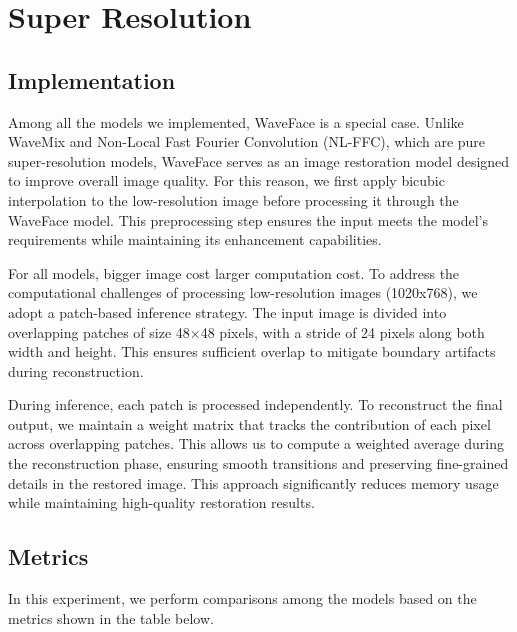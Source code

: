 \section{Super Resolution}
\subsection{Implementation}

Among all the models we implemented, WaveFace is a special case. Unlike WaveMix and Non-Local Fast Fourier Convolution (NL-FFC), which are pure super-resolution models, WaveFace serves as an image restoration model designed to improve overall image quality. For this reason, we first apply bicubic interpolation to the low-resolution image before processing it through the WaveFace model. This preprocessing step ensures the input meets the model's requirements while maintaining its enhancement capabilities.

For all models, bigger image cost larger computation cost. To address the computational challenges of processing low-resolution images (1020x768), we adopt a patch-based inference strategy. The input image is divided into overlapping patches of size 48×48 pixels, with a stride of 24 pixels along both width and height. This ensures sufficient overlap to mitigate boundary artifacts during reconstruction.

During inference, each patch is processed independently. To  reconstruct the final output, we maintain a weight matrix that tracks the contribution of each pixel across overlapping patches. This allows us to compute a weighted average during the reconstruction phase, ensuring smooth transitions and preserving fine-grained details in the restored image. This approach significantly reduces memory usage while maintaining high-quality restoration results.

\subsection{Metrics}
In this experiment, we perform comparisons among the models based on the metrics shown in the table below.

